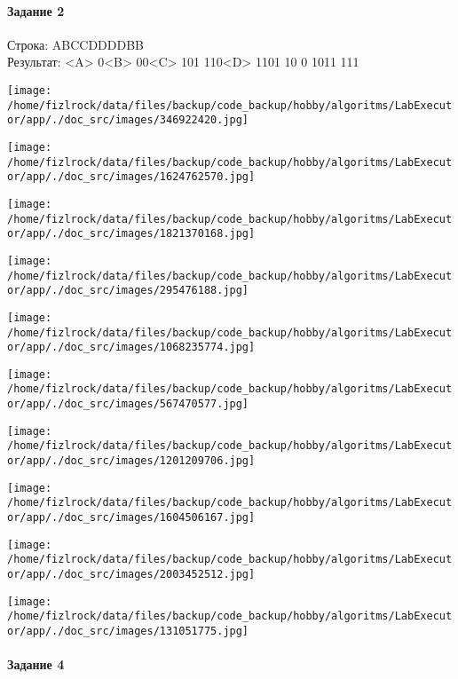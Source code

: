 \documentclass[a4paper, 12pt]{article}
\begin{document}
\paragraph{Задание 2}

Строка: 
ABCCDDDDBB\\
Результат: <A> 0<B> 00<C> 101 110<D> 1101 10 0 1011 111

\texttt{[image: /home/fizlrock/data/files/backup/code\_backup/hobby/algoritms/LabExecutor/app/./doc\_src/images/346922420.jpg]}

\texttt{[image: /home/fizlrock/data/files/backup/code\_backup/hobby/algoritms/LabExecutor/app/./doc\_src/images/1624762570.jpg]}

\texttt{[image: /home/fizlrock/data/files/backup/code\_backup/hobby/algoritms/LabExecutor/app/./doc\_src/images/1821370168.jpg]}

\texttt{[image: /home/fizlrock/data/files/backup/code\_backup/hobby/algoritms/LabExecutor/app/./doc\_src/images/295476188.jpg]}

\texttt{[image: /home/fizlrock/data/files/backup/code\_backup/hobby/algoritms/LabExecutor/app/./doc\_src/images/1068235774.jpg]}

\texttt{[image: /home/fizlrock/data/files/backup/code\_backup/hobby/algoritms/LabExecutor/app/./doc\_src/images/567470577.jpg]}

\texttt{[image: /home/fizlrock/data/files/backup/code\_backup/hobby/algoritms/LabExecutor/app/./doc\_src/images/1201209706.jpg]}

\texttt{[image: /home/fizlrock/data/files/backup/code\_backup/hobby/algoritms/LabExecutor/app/./doc\_src/images/1604506167.jpg]}

\texttt{[image: /home/fizlrock/data/files/backup/code\_backup/hobby/algoritms/LabExecutor/app/./doc\_src/images/2003452512.jpg]}

\texttt{[image: /home/fizlrock/data/files/backup/code\_backup/hobby/algoritms/LabExecutor/app/./doc\_src/images/131051775.jpg]}
\pagebreak
\paragraph{Задание 4}
\end{document}
